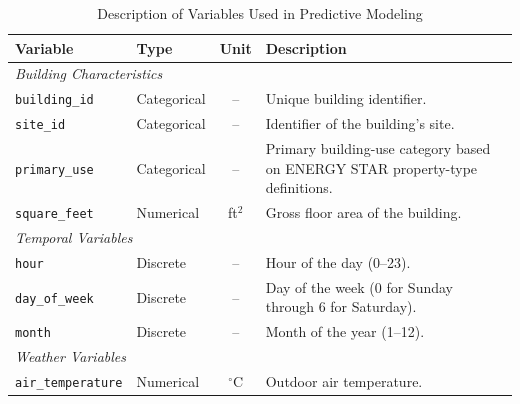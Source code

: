 \documentclass[12pt]{article}
\begin{document}
\begin{table}[htbp]
    \centering
    \caption{Description of Variables Used in Predictive Modeling}
    \label{tab:variable_description}

    \begingroup
    \small
    \renewcommand{\arraystretch}{1.4}
    \setlength{\tabcolsep}{5pt}

    \begin{tabularx}{\textwidth}{
            l
            l
            c
            >{\raggedright\arraybackslash}X
        }
        \toprule
        \textbf{Variable} &
        \textbf{Type} &
        \textbf{Unit} &
        \textbf{Description} \\
        \midrule

        \multicolumn{4}{l}{\textit{Building Characteristics}} \\

        \texttt{building\_id} & Categorical & -- &
        Unique building identifier. \\

        \texttt{site\_id} & Categorical & -- &
        Identifier of the building's site. \\

        \texttt{primary\_use} & Categorical & -- &
        Primary building-use category based on
        ENERGY STAR property-type definitions. \\

        \texttt{square\_feet} & Numerical & ft$^2$ &
        Gross floor area of the building. \\

        \midrule
        \multicolumn{4}{l}{\textit{Temporal Variables}} \\

        \texttt{hour} & Discrete & -- &
        Hour of the day (0--23). \\

        \texttt{day\_of\_week} & Discrete & -- &
        Day of the week (0 for Sunday through 6 for Saturday). \\

        \texttt{month} & Discrete & -- &
        Month of the year (1--12). \\

        \midrule
        \multicolumn{4}{l}{\textit{Weather Variables}} \\

        \texttt{air\_temperature} & Numerical & $^\circ$C &
        Outdoor air temperature. \\


\end{tabularx}
\end{table}
\end{document}
